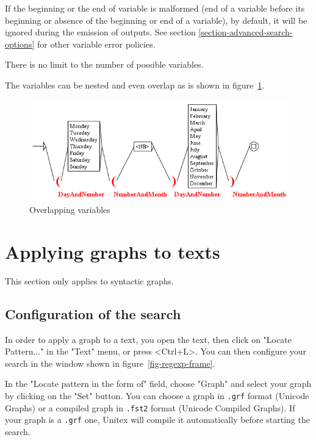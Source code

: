 \bigskip
\noindent If the beginning or the end of variable is malformed (end of a variable before
its beginning or absence of the beginning or end of a variable), by default, it
will be ignored during the emission of outputs. See section
\ref{section-advanced-search-options} for other variable error policies.

\bigskip
\noindent There is no limit to the number of possible variables.

\bigskip
\noindent The variables can be nested and even overlap as is shown in
figure~\ref{fig-overlapping-variables}.

\begin{figure}[!ht]
\begin{center}
\includegraphics[width=15cm]{resources/img/fig6-29.png}
\caption{Overlapping variables\label{fig-overlapping-variables}}
\end{center}
\end{figure}

\section{Applying graphs to texts}
\label{section-applying-graphs-to-text}
This section only applies to syntactic graphs.
\subsection{Configuration of the search}
In order to apply a graph to a text, you open the text, then click on "Locate
Pattern..." in the "Text" menu, or press <Ctrl+L>. You can then configure your
search in the window shown in figure~\ref{fig-regexp-frame}.

\bigskip
{}
\noindent In the "Locate pattern in the form of" field, choose "Graph" and
select your graph by clicking on the "Set" button. You can choose a graph in \verb+.grf+
format (Unicode Graphs) or a compiled graph in \verb+.fst2+ format (Unicode
Compiled Graphs). If your graph is a \verb+.grf+ one, Unitex will compile it
automatically before starting the search.

